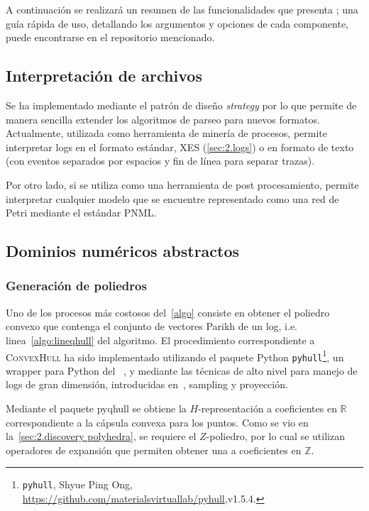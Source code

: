 A continuación se realizará un resumen de las funcionalidades que presenta \pachtool;
una guía rápida de uso, detallando los argumentos y opciones de cada componente,
puede encontrarse en el repositorio mencionado.

\subsection{Interpretación de archivos}
\label{sec:4.parsing}

Se ha implementado mediante el patrón de diseño \textit{strategy} por lo que permite
de manera sencilla extender los algoritmos de parseo para nuevos formatos.
Actualmente, utilizada como herramienta de minería de procesos, permite interpretar 
logs en el formato estándar, XES (\autoref{sec:2.logs}) o en formato de texto (con eventos
separados por espacios y fin de línea para separar trazas).

Por otro lado, si se utiliza \pachtool como una herramienta de post procesamiento, 
permite interpretar cualquier modelo que se encuentre representado
como una red de Petri mediante el estándar PNML.

\subsection{Dominios numéricos abstractos}
\label{sec:4.convex_polyhedra}


\subsubsection{Generación de poliedros}
\label{sec:4.qhull}

Uno de los procesos más costosos del~\autoref{algo} consiste en obtener el poliedro convexo que contenga 
el conjunto de vectores Parikh de un log, i.e. linea~\ref{algo:lineqhull} del algoritmo.
El procedimiento correspondiente a \textsc{ConvexHull} ha sido implementado utilizando el paquete Python
\texttt{pyhull}\footnote{\texttt{pyhull}, Shyue Ping Ong, \url{https://github.com/materialsvirtuallab/pyhull},v1.5.4.}, 
un wrapper para Python del \qhulltool~\cite{Barber96}, y mediante las técnicas de alto nivel para manejo de 
logs de gran dimensión, introducidas en~\cite{CarmonaC14}, sampling y proyección.

Mediante el paquete pyqhull se obtiene la $H$-representación a coeficientes en $\mathbb{R}$ correspondiente a la cápsula convexa
para los puntos. Como se vio en la~\autoref{sec:2.discovery polyhedra}, se requiere el $Z$-poliedro,
por lo cual se utilizan operadores de expansión que permiten obtener una  a coeficientes en $\mathbb{Z}$.


